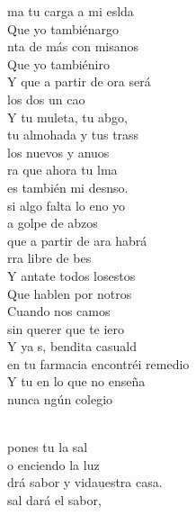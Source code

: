 \begin{cancion}%
	ma tu carga a mi eslda\\
	Que yo tambiénargo\\
	nta de más con misanos\\
	Que yo tambiéniro\\
	Y  que a partir de ora será\\
	 los dos un cao\\
	Y tu muleta, tu abgo,\\
	tu almohada y tus trass\\
	los nuevos y anuos\\
	ra que ahora tu lma\\
	es también mi desnso.\\
	 si algo falta lo eno yo\\
	a golpe de abzos\\
	que a partir de ara habrá\\
	rra libre de bes\\
	Y antate todos losestos\\
	Que hablen por notros\\
	Cuando nos camos\\
	 sin querer que te iero\\
	Y ya s, bendita casuald\\
	 en tu farmacia encontréi remedio\\
	Y tu en  lo que no enseña  \\
	nunca ngún colegio\\\jump\\
	\begin{chorus}%
	 pones tu la sal \\
	o enciendo la luz\\
	drá sabor y vidauestra casa.\\
	 sal dará el sabor, \\

\end{chorus}
\end{cancion}
